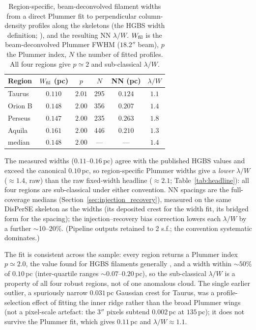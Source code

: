 \documentclass[usenatbib,twoside,twocolumn]{mnras}
\begin{document}
\begin{table}
\caption{Region-specific, beam-deconvolved filament widths from a direct Plummer fit to perpendicular column-density profiles along the skeletons (the HGBS width definition; \citealt{Arzoumanian2019}), and the resulting NN $\lambda/W$. $W_{\rm fil}$ is the beam-deconvolved Plummer FWHM ($18.2''$ beam), $p$ the Plummer index, $N$ the number of fitted profiles. All four regions give $p\simeq2$ and sub-classical $\lambda/W$.}
\label{tab:widths}
\footnotesize
\setlength{\tabcolsep}{3pt}
\begin{tabular}{p{1.7cm}ccccc}
\toprule
Region & $W_{\rm fil}$ (pc) & $p$ & $N$ & NN (pc) & $\lambda/W$ \\
\midrule
Taurus  & $0.110$ & $2.01$ & 295 & $0.124$ & $1.1$ \\
Orion B & $0.148$ & $2.00$ & 356 & $0.207$ & $1.4$ \\
Perseus & $0.147$ & $2.00$ & 235 & $0.263$ & $1.8$ \\
Aquila  & $0.161$ & $2.00$ & 446 & $0.210$ & $1.3$ \\
\midrule
median  & $0.148$ & $2.00$ & --- & --- & $1.4$ \\
\bottomrule
\end{tabular}
\par\vspace{2pt}
\footnotesize The measured widths ($0.11$--$0.16$\,pc) agree with the published HGBS values and exceed the canonical $0.10$\,pc, so region-specific Plummer widths give a \emph{lower} $\lambda/W$ ($\approx1.4$, raw) than the raw fixed-width headline ($\approx2.1$; Table~\ref{tab:headline}): all four regions are sub-classical under either convention. NN spacings are the full-coverage medians (Section~\ref{sec:injection_recovery}), measured on the same DisPerSE skeleton as the widths (its deposited crest for the width fit, its bridged form for the spacing); the injection--recovery bias correction lowers each $\lambda/W$ by a further $\sim$10--20\%. (Pipeline outputs retained to 2 s.f.; the convention systematic dominates.)
\end{table}

The fit is consistent across the sample: every region returns a Plummer index $p\simeq2.0$, the value found for HGBS filaments generally \citep{Arzoumanian2019}, and a width within $\sim50\%$ of $0.10$\,pc (inter-quartile ranges $\sim0.07$--$0.20$\,pc), so the sub-classical $\lambda/W$ is a property of all four robust regions, not of one anomalous cloud. The single earlier outlier, a spuriously narrow $0.031$\,pc Gaussian crest for Taurus, was a profile-selection effect of fitting the inner ridge rather than the broad Plummer wings (not a pixel-scale artefact: the $3''$ pixels subtend $0.002$\,pc at $135$\,pc); it does not survive the Plummer fit, which gives $0.11$\,pc and $\lambda/W\approx1.1$.
\end{document}

